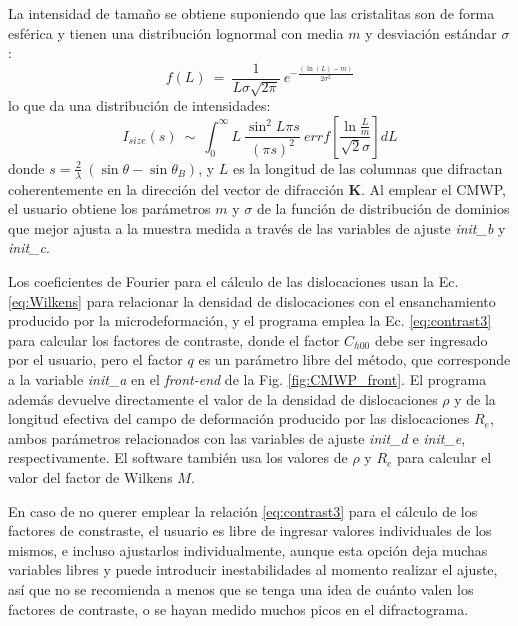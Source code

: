 La intensidad de tamaño se obtiene suponiendo que las cristalitas son de forma esférica y tienen una distribución lognormal con media $m$ y desviación estándar $\sigma$:
\begin{equation}
  f(L) \ = \ \frac{1}{L \sigma \sqrt{2 \pi}} \ e^{-\frac{(\ln(L)-m)}{2 \sigma^2}}
  \label{eq:lognormal}
\end{equation}
\noindent
lo que da una distribución de intensidades\cite{Ribarik2008}:
\begin{equation}
  I_{size}(s) \ \sim \ \int_0^{\infty} L \ \frac{\sin^2{L \pi s}}{(\pi s)^2} \ errf \left[ \frac{\ln{\frac{L}{m}}}{\sqrt{2}\sigma} \right] dL
  \label{eq:Isize}
\end{equation}
\noindent
donde $s = \frac{2}{\lambda} \ (\sin \theta - \sin \theta_B)$, y $L$ es la longitud de las columnas que difractan coherentemente en la dirección del vector de difracción $\mathbf{K}$.
Al emplear el CMWP, el usuario obtiene los parámetros $m$ y $\sigma$ de la función de distribución de dominios que mejor ajusta a la muestra medida a través de las variables de ajuste \textit{init\_b} y \textit{init\_c}.

Los coeficientes de Fourier para el cálculo de las dislocaciones usan la Ec. \ref{eq:Wilkens} para relacionar la densidad de dislocaciones con el ensanchamiento producido por la microdeformación, y el programa emplea la Ec. \ref{eq:contrast3} para calcular los factores de contraste, donde el factor $C_{h00}$ debe ser ingresado por el usuario, pero el factor $q$ es un parámetro libre del método, que corresponde a la variable \textit{init\_a} en el \textit{front-end} de la Fig. \ref{fig:CMWP_front}.
El programa además devuelve directamente el valor de la densidad de dislocaciones $\rho$ y de la longitud efectiva del campo de deformación producido por las dislocaciones $R_e$, ambos parámetros relacionados con las variables de ajuste \textit{init\_d} e \textit{init\_e}, respectivamente. 
El software también usa los valores de $\rho$ y $R_e$ para calcular el valor del factor de Wilkens $M$.

En caso de no querer emplear la relación \ref{eq:contrast3} para el cálculo de los factores de constraste, el usuario es libre de ingresar valores individuales de los mismos, e incluso ajustarlos individualmente, aunque esta opción deja muchas variables libres y puede introducir inestabilidades al momento realizar el ajuste, así que no se recomienda a menos que se tenga una idea de cuánto valen los factores de contraste, o se hayan medido muchos picos en el difractograma.

